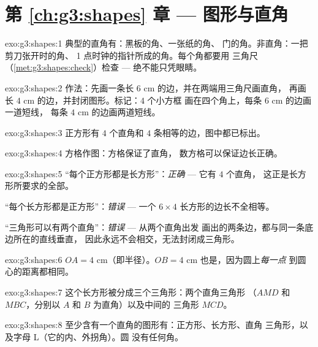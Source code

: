\section*{第 \ref{ch:g3:shapes} 章 --- 图形与直角}

\begin{solution}{exo:g3:shapes:1}
典型的直角有：黑板的角、一张纸的角、
门的角。非直角：一把剪刀张开时的角、
1 点时钟的指针所成的角。每个角都要用
三角尺（\cref{met:g3:shapes:check}）检查 --- 绝不能只凭眼睛。
\end{solution}

\begin{solution}{exo:g3:shapes:2}
作法：先画一条长 $6$ cm 的边，并在两端用三角尺画直角，
再画长 $4$ cm 的边，并封闭图形。标记：$4$ 个小方框
画在四个角上，每条 $6$ cm 的边画一道短线，
每条 $4$ cm 的边画两道短线。
\end{solution}

\begin{solution}{exo:g3:shapes:3}
正方形有 $4$ 个直角和 $4$ 条相等的边，图中都已标出。
\end{solution}

\begin{solution}{exo:g3:shapes:4}
方格作图：方格保证了直角，
数方格可以保证边长正确。
\end{solution}

\begin{solution}{exo:g3:shapes:5}
“每个正方形都是长方形”：\emph{正确} --- 它有 $4$ 个直角，
这正是长方形所要求的全部。

“每个长方形都是正方形”：\emph{错误} --- 一个 $6 \times 4$
长方形的边长不全相等。

“三角形可以有两个直角”：\emph{错误} --- 从两个直角出发
画出的两条边，都与同一条底边所在的直线垂直，
因此永远不会相交，无法封闭成三角形。
\end{solution}

\begin{solution}{exo:g3:shapes:6}
$OA = 4$ cm（即半径）。$OB = 4$ cm 也是，因为圆上\emph{每一点}
到圆心的距离都相同。
\end{solution}

\begin{solution}{exo:g3:shapes:7}
这个长方形被分成三个三角形：两个直角三角形
（$AMD$ 和 $MBC$，分别以 $A$ 和 $B$ 为直角）以及中间的
三角形 $MCD$。
\end{solution}

\begin{solution}{exo:g3:shapes:8}
至少含有一个直角的图形有：正方形、长方形、直角
三角形，以及字母 L（它的内、外拐角）。圆
没有任何角。
\end{solution}

